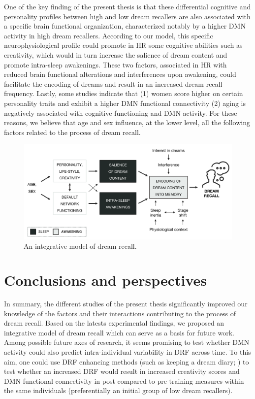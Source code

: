 One of the key finding of the present thesis is that these differential cognitive and personality profiles between high and low dream recallers are also associated with a specific brain functional organization, characterized notably by a higher DMN activity in high dream recallers. According to our model, this specific neurophysiological profile could promote in HR some cognitive abilities such as creativity, which would in turn increase the salience of dream content and promote intra-sleep awakenings. These two factors, associated in HR with reduced brain functional alterations and interferences upon awakening, could facilitate the encoding of dreams and result in an increased dream recall frequency. Lastly, some studies indicate that (1) women score higher on certain personality traits and exhibit a higher DMN functional connectivity (2) aging is negatively associated with cognitive functioning and DMN activity. For these reasons, we believe that age and sex influence, at the lower level, all the following factors related to the process of dream recall.

\begin{figure}[!htbp]
	\includegraphics[width=\textwidth]{Fig/Discussion/schema_dream_recall.png}
	\caption[An integrative model of dream recall]{An integrative model of dream recall.}
	\label{fig:disc:drf:model}
\end{figure}

\section{Conclusions and perspectives}
\label{disc:drf:perspectives}

In summary, the different studies of the present thesis significantly improved our knowledge of the factors and their interactions contributing to the process of dream recall. Based on the latests experimental findings, we proposed an integrative model of dream recall which can serve as a basis for future work. Among possible future axes of research, it seems promising to test whether DMN activity could also predict intra-individual variability in DRF across time. To this aim, one could use DRF enhancing methods (such as keeping a dream diary; \citealp{schredl_questionnaires_2002}) to test whether an increased DRF would result in increased creativity scores and DMN functional connectivity in post compared to pre-training measures within the same individuals (preferentially an initial group of low dream recallers).

